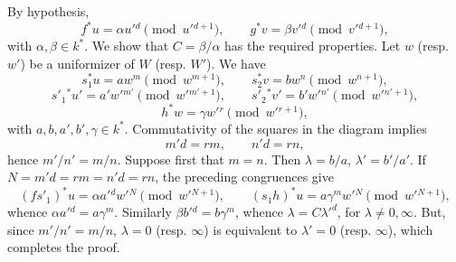 \documentclass[11pt]{article}
\begin{document}
By hypothesis,
\[
f^*u=\alpha u'{}^d\pmod {u'{}^{d+1}},\qquad
g^*v=\beta v'{}^d\pmod {v'{}^{d+1}},
\]
with $\alpha,\beta\in k^*$. We show that $C=\beta/\alpha$ has the required properties. Let $w$ (resp. $w'$) be a uniformizer of $W$ (resp. $W'$). We have
\[
s_1^*u=aw^m\pmod {w^{m+1}},\qquad
s_2^*v=bw^n\pmod {w^{n+1}},
\]
\[
s'_1{}^*u'=a'w'{}^{m'}\pmod {w'{}^{m'+1}},\qquad
s'_2{}^*v'=b'w'{}^{n'}\pmod {w'{}^{n'+1}},
\]
\[
h^*w=\gamma w'{}^r\pmod {w'{}^{r+1}},
\]
with $a,b,a',b',\gamma\in k^*$. Commutativity of the squares in the diagram implies
\[
m'd=rm,\qquad n'd=rn,
\]
hence $m'/n'=m/n$. Suppose first that $m=n$. Then $\lambda=b/a$, $\lambda'=b'/a'$. If $N=m'd=rm=n'd=rn$, the preceding congruences give
\[
(fs'_1)^*u=\alpha a'{}^d w'{}^N\pmod {w'{}^{N+1}},\qquad
(s_1h)^*u=a\gamma^m w'{}^N\pmod {w'{}^{N+1}},
\]
whence $\alpha a'{}^d=a\gamma^m$. Similarly $\beta b'{}^d=b\gamma^m$, whence $\lambda=C{\lambda'}^d$, for $\lambda\ne0,\infty$. But, since $m'/n'=m/n$, $\lambda=0$ (resp. $\infty$) is equivalent to $\lambda'=0$ (resp. $\infty$), which completes the proof.
\end{document}
